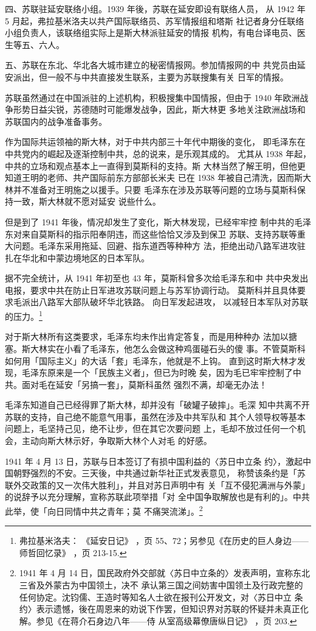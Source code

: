 四、苏联驻延安联络小组。1939 年後，苏联在延安即设有联络人员，
从 1942 年 5 月起，弗拉基米洛夫以共产国际联络员、苏军情报组和塔斯
社记者身分任联络小组负责人，该联络组实际上是斯大林派驻延安的情报
机构，有电台译电员、医生等五、六人。

五、苏联在东北、华北各大城市建立的秘密情报网。参加情报网的中
共党员由延安派出，但一般不与中共直接发生联系，主要为苏联搜集有关
日军的情报。

苏联虽然通过在中国派驻的上述机构，积极搜集中国情报，但由于
1940 年欧洲战争形势日益尖锐，苏德随时可能爆发战争，因此，斯大林更
多地关注欧洲战场和苏联国内的战争准备事务。

作为国际共运领袖的斯大林，对于中共内部三十年代中期後的变化，
即毛泽东在中共党内的崛起及逐渐控制中共，总的说来，是乐观其成的。
尤其从 1938 年起，中共的立场和观点基本上一直得到莫斯科的支持。斯
大林当然了解王明，但他更知道王明的老师、共产国际前东方部部长米夫
已在 1938 年被自己清洗，因而斯大林并不准备对王明施之以援手。只要
毛泽东在涉及苏联等问题的立场与莫斯科保持一致，斯大林就不愿对延安
说些什么。

但是到了 1941 年後，情况却发生了变化，斯大林发现，已经牢牢控
制中共的毛泽东对来自莫斯科的指示阳奉阴违，而这些恰恰又涉及到保卫
苏联、支持苏联等重大问题。毛泽东采用拖延、回避、指东道西等种种方
法，拒绝出动八路军进攻驻扎在华北和中蒙边境地区的日本军队。

据不完全统计，从 1941 年初至也 43 年，莫斯科曾多次给毛泽东和中
共中央发出电报，要求中共在防止日军进攻苏联问题上与苏军协调行动。
莫斯科并且具体要求毛派出八路军大部队破坏华北铁路。
向日军发起进攻，
以减轻日本军队对苏联的压力。\footnote{弗拉基米洛夫：
《延安日记》
，页 55、72；另参见《在历史的巨人身边——师哲回忆录》
，页 213-15. }

对于斯大林所有这类要求，毛泽东均未作出肯定答复，而是用种种办
法加以搪塞。斯大林实在小看了毛泽东，他怎么会做这种鸡蛋碰石头的傻
事。不管莫斯科如何用「国际主义」的大话「套」毛泽东，他就是不上钩。
直到这时斯大林才发现，毛泽东原来是一个「民族主义者」，但已为时晚
矣，因为毛已牢牢控制了中共。面对毛在延安「另搞一套」，莫斯科虽然
强烈不满，却毫无办法！

毛泽东知道自己已经得罪了斯大林，却并没有「破罐子破摔」。毛深
知中共离不开苏联的支持，自己绝不能意气用事，虽然在涉及中共军队和
其个人领导权等基本问题上，毛坚持己见，绝不让步，但在其它次要问题
上，毛却不放过任何一个机会，主动向斯大林示好，争取斯大林个人对毛
的好感。

1941 年 4 月 13 日，苏联与日本签订了有损中国利益的〈苏日中立条
约〉，激起中国朝野强烈的不安。三天後，中共通过新华社正式发表意见，
称赞该条约是「苏联外交政策的又一次伟大胜利」，并且对苏日声明中有
关「互不侵犯满洲与外蒙」的说辞予以充分理解，宣称苏联此项举措「对
全中国争取解放也是有利的」。中共此举，使「向日同情中共之青年；莫
不痛哭流涕」。\footnote{1941 年 4 月 14 日，国民政府外交部就〈苏日中立条的〉发表声明，宣称东北三省及外蒙古为中国领土，决不
承认第三国之间妨害中国领土及行政完整的任何协定。沈钧儒、王造时等知名人士欲在报刊公开发文，对〈苏日中立
条约〉表示遗憾，後在周恩来的劝说下作罢，但知识界对苏联的怀疑并未真正化解。参见《在蒋介石身边八年——侍
从室高级幕僚唐纵日记》
，页 203. 
}


